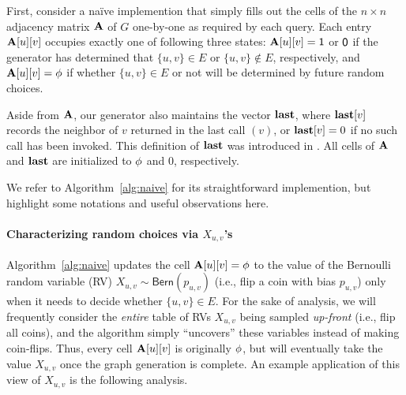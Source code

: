 First, consider a na\"{i}ve implemention that simply fills out the cells of the $n\times n$ adjacency matrix $\ADJ$ of $G$ one-by-one as required by each query.
Each entry $\ADJ[u][v]$ occupies exactly one of following three states:
$\mathbf{A}[u][v] = \mathsf{1}$ or $\ZERO$ if the generator has determined that $\{u,v\}\in E$ or $\{u,v\} \notin E$, respectively, and $\mathbf{A}[u][v] = \phi$ if whether $\{u,v\} \in E$ or not will be determined by future random choices.
\iffalse
\begin{itemize}
\item $\ONE$ if the generator has determined that $\{u,v\} \in E$.
\item $\ZERO$ if the generator has determined that $\{u,v\} \notin E$.
\item $\PHI$ if whether $\{u,v\} \in E$ or not will be determined by future random choices. In particular, %
the marginal probability that $\{u,v\} \in E$, conditioned on the current state of $\ADJ$, is still exactly $p_{u,v}$. %
\end{itemize}
\fi
Aside from $\ADJ$, our generator also maintains the vector $\LAST$, where $\mathbf{last}[v]$ records the neighbor of $v$ returned in the last call $(v)$, or $\mathbf{last}[v]=0$ if no such call has been invoked.
This definition of $\LAST$ was introduced in \cite{reut}.
All cells of $\ADJ$ and $\LAST$ are initialized to $\PHI$ and $0$, respectively.
\iffalse
We initialize the data structure by setting all entries of $\ADJ$ to $\PHI$ and those of $\LAST$ to $0$. %
At any point during the execution, $\ADJ$ will be symmetric, composed entirely of $\ONE, \ZERO$ and $\PHI$. Entries $\ADJ[u][v]$ and $\ADJ[v][u]$ correspond to the same edge and will always be updated together.
\fi
We refer to Algorithm~\ref{alg:naive} for its straightforward implemention, but highlight some notations and useful observations here.

\paragraph*{Characterizing random choices via $X_{u,v}$'s}
Algorithm~\ref{alg:naive} updates the cell $\mathbf{A}[u][v] = \phi$ to the value of the Bernoulli random variable (RV) $X_{u,v} \sim \mathsf{Bern}(p_{u,v})$
(i.e., flip a coin with bias $p_{u,v}$) only when it needs to decide whether $\{u,v\}\in E$.
For the sake of analysis, we will frequently consider the \emph{entire} table of RVs $X_{u,v}$ being sampled \emph{up-front} (i.e., flip all coins),
and the algorithm simply ``uncovers'' these variables instead of making coin-flips.
Thus, every cell $\ADJ[u][v]$ is originally $\PHI$, but will eventually take the value $X_{u,v}$ once the graph generation is complete.
An example application of this view of $X_{u,v}$ is the following analysis.

